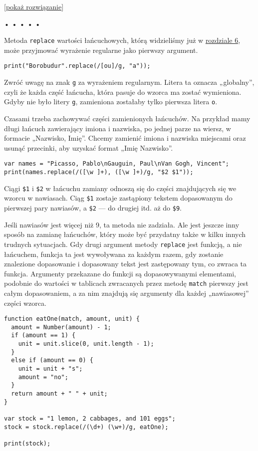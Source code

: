   
[\hyperref[sol:10.3]{pokaż rozwiązanie}]
  


\begin{center}
• • • • •
\end{center}

  
Metoda \texttt{replace} wartości łańcuchowych, którą widzieliśmy już w \hyperref[chap:6]{rozdziale 6}, może przyjmować wyrażenie regularne jako pierwszy argument.

  
\begin{verbatim} 
print("Borobudur".replace(/[ou]/g, "a"));
 \end{verbatim}
  
Zwróć uwagę na znak \texttt{g} za wyrażeniem regularnym. Litera ta oznacza „globalny”, czyli że każda część łańcucha, która pasuje do wzorca ma zostać wymieniona. Gdyby nie było litery \texttt{g}, zamieniona zostałaby tylko pierwsza litera \texttt{o}.

  
Czasami trzeba zachowywać części zamienionych łańcuchów. Na przykład mamy długi łańcuch zawierający imiona i nazwiska, po jednej parze na wiersz, w formacie „Nazwisko, Imię”. Chcemy zamienić imiona i nazwiska miejscami oraz usunąć przecinki, aby uzyskać format „Imię Nazwisko”.

  
\begin{verbatim} 
var names = "Picasso, Pablo\nGauguin, Paul\nVan Gogh, Vincent";
print(names.replace(/([\w ]+), ([\w ]+)/g, "$2 $1"));
 \end{verbatim}
  
Ciągi \texttt{\$1} i \texttt{\$2} w łańcuchu zamiany odnoszą się do części znajdujących się we wzorcu w nawiasach. Ciąg \texttt{\$1} zostaje zastąpiony tekstem dopasowanym do pierwszej pary nawiasów, a \texttt{\$2} — do drugiej itd. aż do \texttt{\$9}.

  
Jeśli nawiasów jest więcej niż 9, ta metoda nie zadziała. Ale jest jeszcze inny sposób na zamianę łańcuchów, który może być przydatny także w kilku innych trudnych sytuacjach. Gdy drugi argument metody \texttt{replace} jest funkcją, a nie łańcuchem, funkcja ta jest wywoływana za każdym razem, gdy zostanie znalezione dopasowanie i dopasowany tekst jest zastępowany tym, co zwraca ta funkcja. Argumenty przekazane do funkcji są dopasowywanymi elementami, podobnie do wartości w tablicach zwracanych przez metodę \texttt{match} pierwszy jest całym dopasowaniem, a za nim znajdują się argumenty dla każdej „nawiasowej” części wzorca.

  
\begin{verbatim} 
function eatOne(match, amount, unit) {
  amount = Number(amount) - 1;
  if (amount == 1) {
    unit = unit.slice(0, unit.length - 1);
  }
  else if (amount == 0) {
    unit = unit + "s";
    amount = "no";
  }
  return amount + " " + unit;
}

var stock = "1 lemon, 2 cabbages, and 101 eggs";
stock = stock.replace(/(\d+) (\w+)/g, eatOne);

print(stock);
 \end{verbatim}


